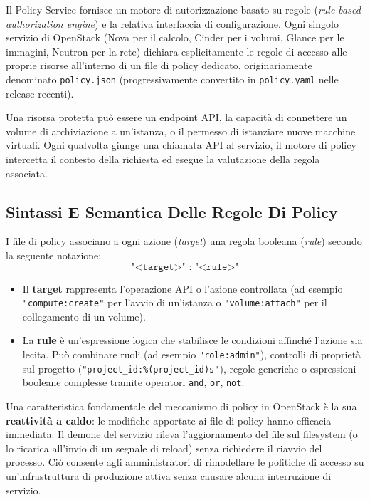 \documentclass[11pt, a4paper]{article}
\begin{document}
Il Policy Service fornisce un motore di autorizzazione basato su regole (\emph{rule-based authorization engine}) e la relativa interfaccia di configurazione. Ogni singolo servizio di OpenStack (Nova per il calcolo, Cinder per i volumi, Glance per le immagini, Neutron per la rete) dichiara esplicitamente le regole di accesso alle proprie risorse all'interno di un file di policy dedicato, originariamente denominato \texttt{policy.json} (progressivamente convertito in \texttt{policy.yaml} nelle release recenti).

Una risorsa protetta può essere un endpoint API, la capacità di connettere un volume di archiviazione a un'istanza, o il permesso di istanziare nuove macchine virtuali. Ogni qualvolta giunge una chiamata API al servizio, il motore di policy intercetta il contesto della richiesta ed esegue la valutazione della regola associata.

\subsection{Sintassi E Semantica Delle Regole Di Policy}

I file di policy associano a ogni azione (\emph{target}) una regola booleana (\emph{rule}) secondo la seguente notazione:
\[
\texttt{"<target>" : "<rule>"}
\]
\begin{itemize}[noitemsep]
    \item Il \textbf{target} rappresenta l'operazione API o l'azione controllata (ad esempio \texttt{"compute:create"} per l'avvio di un'istanza o \texttt{"volume:attach"} per il collegamento di un volume).
    \item La \textbf{rule} è un'espressione logica che stabilisce le condizioni affinché l'azione sia lecita. Può combinare ruoli (ad esempio \texttt{"role:admin"}), controlli di proprietà sul progetto (\texttt{"project\_id:\%(project\_id)s"}), regole generiche o espressioni booleane complesse tramite operatori \texttt{and}, \texttt{or}, \texttt{not}.
\end{itemize}

Una caratteristica fondamentale del meccanismo di policy in OpenStack è la sua \textbf{reattività a caldo}: le modifiche apportate ai file di policy hanno efficacia immediata. Il demone del servizio rileva l'aggiornamento del file sul filesystem (o lo ricarica all'invio di un segnale di reload) senza richiedere il riavvio del processo. Ciò consente agli amministratori di rimodellare le politiche di accesso su un'infrastruttura di produzione attiva senza causare alcuna interruzione di servizio.
\end{document}
